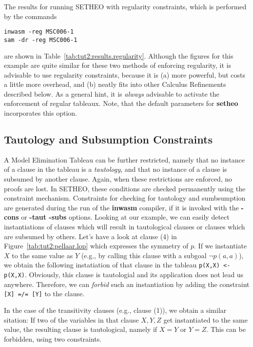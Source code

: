 The results for running SETHEO with regularity constraints, which
is performed by the commands
\begin{center}
\begin{verbatim}
inwasm -reg MSC006-1
sam -dr -reg MSC006-1
\end{verbatim}
\end{center}
are shown in Table~\ref{tab:tut2:results.regularity}.
Although the figures for this example are quite similar for these
two methods of enforcing regularity, it is advisable to use regularity
constraints,
because it is (a) more powerful, but costs a little
more overhead, and (b) neatly fits into other Calculus Refinements
described below. As a general hint, it is {\em always\/} advisable to
activate the enforcement of regular tableaux. Note, that the
default parameters for {\bf setheo} incorporates this option.

\subsection{Tautology and Subsumption Constraints}

A Model Elimination Tableau can be further restricted, namely that
no instance of a clause in the tableau is a {\em tautology\/}, and
that no instance of a clause is subsumed by another clause.
Again, when these restrictions are enforced, no proofs are lost.
In SETHEO, these conditions are checked permanently using
the constraint mechanism. Constraints for checking for tautology and
sumbsumption are generated during the run of the {\bf inwasm} compiler,
if it is invoked with the {\bf -cons} or {\bf -taut -subs} options.
Looking at our example, we can easily detect instantiations of clauses
which will result in tautological clauses or clauses which are subsumed
by others. Let's have a look at clause (4) in 
Figure~\ref{tab:tut2:pellaar.lop} which expresses the symmetry of $p$.
If we instantiate $X$ to the same value as $Y$ (e.g., by calling this
clause with a subgoal $\neg p(a,a)$), we obtain the following
instatiation of that clause in the tableau
{\tt p(X,X) <- p(X,X)}. Obviously, this clause is tautologial and
its application does not lead us anywhere. Therefore, we can {\em forbid\/}
such an instantiation by adding the constraint {\tt [X] =/= [Y]}
to the clause.

In the case of the transitivity clauses (e.g., clause (1)), 
we obtain a similar sitation:
If two of the variables in that clause $X,Y,Z$ get instantiated to the
same value, the resulting clause is tautological, namely if
$X = Y$ or $Y = Z$. This can be forbidden, using two constraints.

